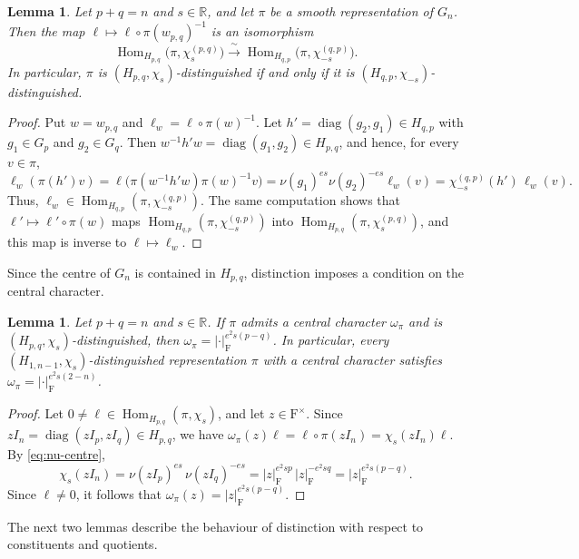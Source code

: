 \documentclass[11pt]{amsart}
\numberwithin{equation}{section}
\theoremstyle{plain}
\newtheorem{lemma}[theorem]{Lemma}
\theoremstyle{definition}
\theoremstyle{remark}
\newcommand{\R}{\mathbb{R}}
\DeclareMathOperator{\Hom}{Hom}
\DeclareMathOperator{\diag}{diag}
\begin{document}
\begin{lemma}\label{lem:swap}
	Let $p+q=n$ and $s\in\R$, and let $\pi$ be a smooth representation of $G_n$. Then the map $\ell\mapsto\ell\circ\pi(w_{p,q})^{-1}$ is an isomorphism
	$$
	\Hom_{H_{p,q}}\big(\pi,\chi^{(p,q)}_s\big)\xrightarrow{\ \sim\ }\Hom_{H_{q,p}}\big(\pi,\chi^{(q,p)}_{-s}\big).
	$$
	In particular, $\pi$ is $(H_{p,q},\chi_s)$-distinguished if and only if it is $(H_{q,p},\chi_{-s})$-distinguished.
\end{lemma}

\begin{proof}
	Put $w=w_{p,q}$ and $\ell_w=\ell\circ\pi(w)^{-1}$. Let $h'=\diag(g_2,g_1)\in H_{q,p}$ with $g_1\in G_p$ and $g_2\in G_q$. Then $w^{-1}h'w=\diag(g_1,g_2)\in H_{p,q}$, and hence, for every $v\in\pi$,
	$$
	\ell_w(\pi(h')v)=\ell\big(\pi(w^{-1}h'w)\pi(w)^{-1}v\big)=\nu(g_1)^{es}\nu(g_2)^{-es}\ell_w(v)=\chi^{(q,p)}_{-s}(h')\,\ell_w(v).
	$$
	Thus, $\ell_w\in\Hom_{H_{q,p}}(\pi,\chi^{(q,p)}_{-s})$. The same computation shows that $\ell'\mapsto\ell'\circ\pi(w)$ maps $\Hom_{H_{q,p}}(\pi,\chi^{(q,p)}_{-s})$ into $\Hom_{H_{p,q}}(\pi,\chi^{(p,q)}_s)$, and this map is inverse to $\ell\mapsto\ell_w$.
\end{proof}

Since the centre of $G_n$ is contained in $H_{p,q}$, distinction imposes a condition on the central character.

\begin{lemma}\label{lem:central}
	Let $p+q=n$ and $s\in\R$. If $\pi$ admits a central character $\omega_\pi$ and is $(H_{p,q},\chi_s)$-distinguished, then $\omega_\pi=|\cdot|_{\mathrm{F}}^{e^2s(p-q)}$. In particular, every $(H_{1,n-1},\chi_s)$-distinguished representation $\pi$ with a central character satisfies $\omega_\pi=|\cdot|_{\mathrm{F}}^{e^2s(2-n)}$.
\end{lemma}

\begin{proof}
	Let $0\ne\ell\in\Hom_{H_{p,q}}(\pi,\chi_s)$, and let $z\in\mathrm{F}^\times$. Since $zI_n=\diag(zI_p,zI_q)\in H_{p,q}$, we have $\omega_\pi(z)\ell=\ell\circ\pi(zI_n)=\chi_s(zI_n)\ell$. By \eqref{eq:nu-centre},
	$$
	\chi_s(zI_n)=\nu(zI_p)^{es}\,\nu(zI_q)^{-es}=|z|_{\mathrm{F}}^{e^2sp}\,|z|_{\mathrm{F}}^{-e^2sq}=|z|_{\mathrm{F}}^{e^2s(p-q)}.
	$$
	Since $\ell\ne0$, it follows that $\omega_\pi(z)=|z|_{\mathrm{F}}^{e^2s(p-q)}$.
\end{proof}

The next two lemmas describe the behaviour of distinction with respect to constituents and quotients.
\end{document}
